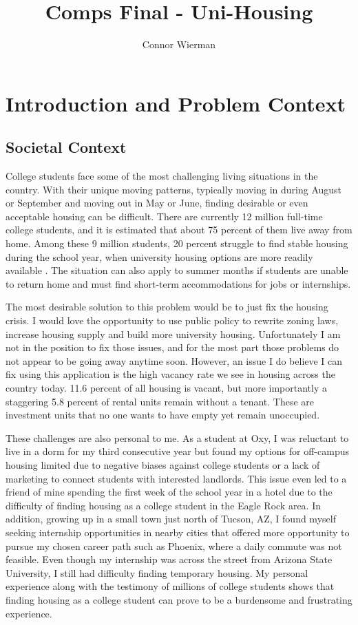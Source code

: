 \documentclass[10pt,twocolumn]{article}
\title{Comps Final - Uni-Housing}
\author{Connor Wierman}
\affiliation{Occidental College}
\begin{document}
\maketitle

\section{Introduction and Problem Context}
\subsection{Societal Context}
College students face some of the most challenging living situations in the country. With their unique moving patterns, typically moving in during August or September and moving out in May or June, finding desirable or even acceptable housing can be difficult. There are currently 12 million full-time college students, and it is estimated that about 75 percent of them live away from home. Among these 9 million students, 20 percent struggle to find stable housing during the school year, when university housing options are more readily available \cite{CNBC}. The situation can also apply to summer months if students are unable to return home and must find short-term accommodations for jobs or internships.

The most desirable solution to this problem would be to just fix the housing crisis. I would love the opportunity to use public policy to rewrite zoning laws, increase housing supply and build more university housing. Unfortunately I am not in the position to fix those issues, and for the most part those problems do not appear to be going away anytime soon. However, an issue I do believe I can fix using this application is the high vacancy rate we see in housing across the country today. 11.6 percent of all housing is vacant, but more importantly a staggering 5.8 percent of rental units remain without a tenant. \cite{AnytimeEstimate} These are investment units that no one wants to have empty yet remain unoccupied. 

These challenges are also personal to me. As a student at Oxy, I was reluctant to live in a dorm for my third consecutive year but found my options for off-campus housing limited due to negative biases against college students or a lack of marketing to connect students with interested landlords. This issue even led to a friend of mine spending the first week of the school year in a hotel due to the difficulty of finding housing as a college student in the Eagle Rock area. In addition, growing up in a small town just north of Tucson, AZ, I found myself seeking internship opportunities in nearby cities that offered more opportunity to pursue my chosen career path such as Phoenix, where a daily commute was not feasible. Even though my internship was across the street from Arizona State University, I still had difficulty finding temporary housing. My personal experience along with the testimony of millions of college students shows that finding housing as a college student can prove to be a burdensome and frustrating experience.
\end{document}
